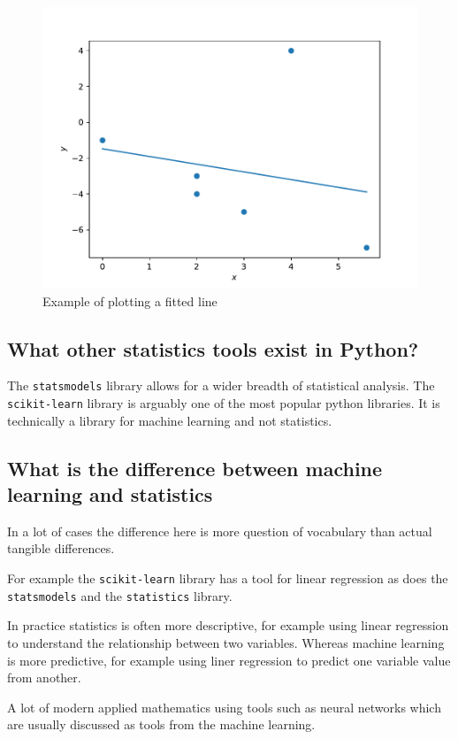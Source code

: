 \begin{figure}[!hbtp]
\begin{center}
\includegraphics[width=.7\textwidth]{./assets/example_plot_of_fitted_line/main.pdf}
\end{center}
\caption{Example of plotting a fitted line}
\label{fig:example_plot_of_fitted_line}
\end{figure}



\subsection{What other statistics tools exist in Python?}
\label{\detokenize{tools-for-mathematics/08-statistics/why/main:what-other-statistics-tools-exist-in-python}}

The \texttt{statsmodels} library allows for a wider breadth of statistical
analysis.
The \texttt{scikit-learn} library is arguably one of the most popular python libraries.
It is technically a library for machine learning and not statistics.


\subsection{What is the difference between machine learning and statistics}
\label{\detokenize{tools-for-mathematics/08-statistics/why/main:what-is-the-difference-between-machine-learning-and-statistics}}

In a lot of cases the difference here is more question of vocabulary than
actual tangible differences.


For example the \texttt{scikit-learn} library has a tool for linear regression as does
the \texttt{statsmodels} and the \texttt{statistics} library.


In practice statistics is often more descriptive, for example using linear
regression to understand the relationship between two variables. Whereas machine
learning is more predictive, for example using liner regression to predict one
variable value from another.


A lot of modern applied mathematics using tools such as neural networks which
are usually discussed as tools from the machine learning.
